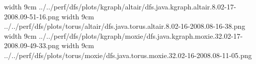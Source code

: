  \pdfimage width 9cm {../../perf/dfs/plots/kgraph/altair/dfs.java.kgraph.altair.8.02-17-2008.09-51-16.png}
 \pdfimage width 9cm {../../perf/dfs/plots/torus/altair/dfs.java.torus.altair.8.02-16-2008.08-16-38.png}
 \pdfimage width 9cm {../../perf/dfs/plots/kgraph/moxie/dfs.java.kgraph.moxie.32.02-17-2008.09-49-33.png}
 \pdfimage width 9cm {../../perf/dfs/plots/torus/moxie/dfs.java.torus.moxie.32.02-16-2008.08-11-05.png}
